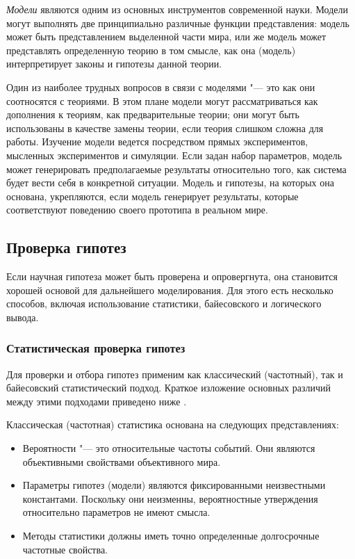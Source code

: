 \textit{Модели} являются одним из основных инструментов современной науки. Модели могут выполнять две принципиально 
различные функции представления: модель может быть представлением выделенной части мира, или же модель может 
представлять определенную теорию в том смысле, как она (модель) интерпретирует законы и гипотезы данной теории.

Один из наиболее трудных вопросов в связи с моделями "--- это как они соотносятся с теориями. В этом плане модели 
могут рассматриваться как дополнения к теориям, как предварительные теории; они могут быть использованы в качестве 
замены теории, если теория слишком сложна для работы. Изучение модели ведется посредством прямых экспериментов, 
мысленных экспериментов и симуляции. Если задан набор параметров, модель может генерировать предполагаемые результаты 
относительно того, как система будет вести себя в конкретной ситуации. Модель и гипотезы, на которых она основана, 
укрепляются, если модель генерирует результаты, которые соответствуют поведению своего прототипа в реальном мире. 

\subsection{Проверка гипотез}\label{sect1_2_2}
Если научная гипотеза может быть проверена и опровергнута, она становится хорошей основой для дальнейшего 
моделирования. Для этого есть несколько способов, включая использование статистики, байесовского и логического вывода.
\subsubsection{Статистическая проверка гипотез}\label{sect1_2_2_1}
Для проверки и отбора гипотез применим как классический (частотный), так и байесовский статистический подход. 
Краткое изложение основных различий между этими подходами приведено ниже \cite{ivezic2019statistics}.

Классическая (частотная) статистика основана на следующих представлениях:
\begin{itemize}
    \item Вероятности "--- это относительные частоты событий. Они являются объективными свойствами объективного мира.
    \item Параметры гипотез (модели) являются фиксированными неизвестными константами. Поскольку они неизменны, 
            вероятностные утверждения относительно параметров не имеют смысла.
    \item Методы статистики должны иметь точно определенные долгосрочные частотные свойства.
\end{itemize}

